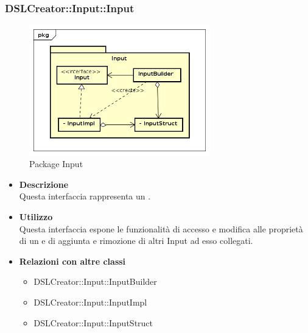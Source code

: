  \subsubsection{DSLCreator::Input::Input}
                 \begin{figure}[H]
                  \centering
                  \includegraphics[width=0.7\textwidth]{res/img/Input.png}
                  \caption{Package Input}
                  \label{fig:diagram_model}
                \end{figure}
                    \begin{itemize}
                        \item \textbf{Descrizione} \hfill \\
                          Questa interfaccia rappresenta un .
                        \item \textbf{Utilizzo} \hfill \\
                          Questa interfaccia espone le funzionalità di accesso e modifica alle proprietà di un  e di aggiunta e rimozione di altri Input ad esso collegati.
                        \item \textbf{Relazioni con altre classi}
                            \begin{itemize}
                              \item DSLCreator::Input::InputBuilder
                              \item DSLCreator::Input::InputImpl
                              \item DSLCreator::Input::InputStruct
                            \end{itemize}
                    \end{itemize}  

